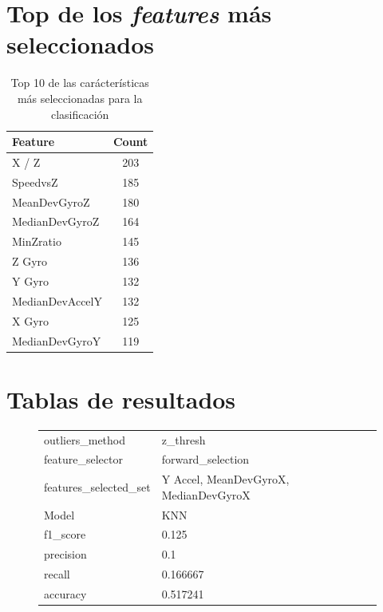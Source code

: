 \begin{appendices}
	\newpage
	\section*{Top de los \emph{features} más seleccionados}
	
	\begin{table}[htb]
		\centering
		\caption{Top 10 de las carácterísticas más seleccionadas para la clasificación}
		\label{table:12}
			\begin{tabular}{lc}
			\toprule
					Feature &  Count \\
			\midrule
					  X / Z &    203 \\
				   SpeedvsZ &    185 \\
			   MeanDevGyroZ &    180 \\
			 MedianDevGyroZ &    164 \\
				  MinZratio &    145 \\
					 Z Gyro &    136 \\
					 Y Gyro &    132 \\
			MedianDevAccelY &    132 \\
					 X Gyro &    125 \\
			 MedianDevGyroY &    119 \\
			\bottomrule
			\end{tabular}
	\end{table}
	
	\newpage
	\section*{Tablas de resultados}
		\begin{figure}[htb]
			\centering
			\begin{tabular}{ll}
				\toprule
					  outliers\_method &                                z\_thresh \\
					 feature\_selector &                       forward\_selection \\
				features\_selected\_set & {Y Accel, MeanDevGyroX, MedianDevGyroX} \\
								Model &                                     KNN \\
						f1\_score &                                   0.125 \\
					   precision &                                     0.1 \\
						  recall &                                0.166667 \\
						accuracy &                                0.517241 \\
				\bottomrule
			\end{tabular}
			\newline
			\newline


\end{figure}
\end{appendices}
